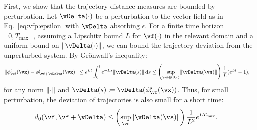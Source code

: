 \documentclass{article}
\theoremstyle{definition} \newtheorem{definition}{Definition}  \newtheorem{example}{Example}
\theoremstyle{remark} \newtheorem{remark}{Remark}
\newcounter{ct}
\DeclarePairedDelimiter{\norm}{\lVert}{\rVert}
\begin{document}
First, we show that the trajectory distance measures are bounded by perturbation.
Let $\vDelta(\cdot)$ be a perturbation to the vector field as in Eq.~\ref{eq:vfp:epsilon} with $\vDelta$ absorbing $\epsilon$.
For a finite time horizon $[0, T_\text{max}]$, assuming a Lipschitz bound $L$ for $\vf(\cdot)$ in the relevant domain and a uniform bound on $\norm{\vDelta(\cdot)}$, we can bound the trajectory deviation from the unperturbed system.
By Gr\"onwall's inequality\cite{Howard2025}:
\begin{align}\label{eq:gronwall}
    \norm{
	\phi^t_\vf(\vx)
	-
	\phi^t_{\vf + \vDelta}(\vx)
    }
    &\leq
	e^{Lt} \int_0^{t} e^{-Ls} \norm{\vDelta(s)} \,\mathrm{d}s
    \leq
    \left(\sup_{\vs \in (0, t)} \norm{\vDelta(\vs)}\right) \frac{1}{L} (e^{Lt} - 1),
\end{align}
for any norm $\norm{\cdot}$ and $\vDelta(s) \coloneq \vDelta(\phi^s_\vf(\vx))$.
Thus, for small perturbation, the deviation of trajectories is also small for a short time:
\begin{align}\label{eq:d0bound}
    \bar{d}_0(\vf, \vf + \vDelta)
    &\leq
    \left(\sup_\vs \norm{\vDelta(\vs)}\right) \frac{1}{L^2} e^{LT_{\text{max}}}.
\end{align}
\end{document}
